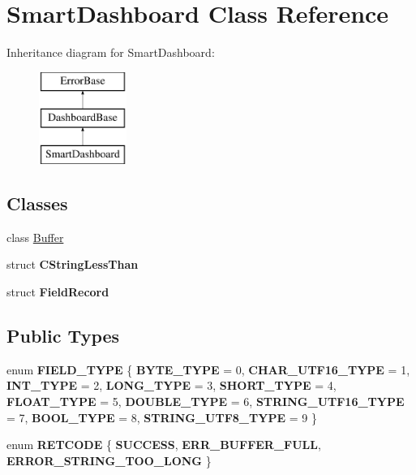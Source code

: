\hypertarget{classSmartDashboard}{\section{\-Smart\-Dashboard \-Class \-Reference}
\label{classSmartDashboard}
}
\-Inheritance diagram for \-Smart\-Dashboard\-:\begin{figure}[H]
\begin{center}
\leavevmode
\includegraphics[height=3.000000cm]{classSmartDashboard}
\end{center}
\end{figure}
\subsection*{\-Classes}
\begin{DoxyCompactItemize}
\item 
class \hyperlink{classSmartDashboard_1_1Buffer}{\-Buffer}
\item 
struct {\bfseries \-C\-String\-Less\-Than}
\item 
struct {\bfseries \-Field\-Record}
\end{DoxyCompactItemize}
\subsection*{\-Public \-Types}
\begin{DoxyCompactItemize}
\item 
enum {\bfseries \-F\-I\-E\-L\-D\-\_\-\-T\-Y\-P\-E} \{ \*
{\bfseries \-B\-Y\-T\-E\-\_\-\-T\-Y\-P\-E} =  0, 
{\bfseries \-C\-H\-A\-R\-\_\-\-U\-T\-F16\-\_\-\-T\-Y\-P\-E} =  1, 
{\bfseries \-I\-N\-T\-\_\-\-T\-Y\-P\-E} =  2, 
{\bfseries \-L\-O\-N\-G\-\_\-\-T\-Y\-P\-E} =  3, 
\*
{\bfseries \-S\-H\-O\-R\-T\-\_\-\-T\-Y\-P\-E} =  4, 
{\bfseries \-F\-L\-O\-A\-T\-\_\-\-T\-Y\-P\-E} =  5, 
{\bfseries \-D\-O\-U\-B\-L\-E\-\_\-\-T\-Y\-P\-E} =  6, 
{\bfseries \-S\-T\-R\-I\-N\-G\-\_\-\-U\-T\-F16\-\_\-\-T\-Y\-P\-E} =  7, 
\*
{\bfseries \-B\-O\-O\-L\-\_\-\-T\-Y\-P\-E} =  8, 
{\bfseries \-S\-T\-R\-I\-N\-G\-\_\-\-U\-T\-F8\-\_\-\-T\-Y\-P\-E} =  9
 \}
\item 
enum {\bfseries \-R\-E\-T\-C\-O\-D\-E} \{ {\bfseries \-S\-U\-C\-C\-E\-S\-S}, 
{\bfseries \-E\-R\-R\-\_\-\-B\-U\-F\-F\-E\-R\-\_\-\-F\-U\-L\-L}, 
{\bfseries \-E\-R\-R\-O\-R\-\_\-\-S\-T\-R\-I\-N\-G\-\_\-\-T\-O\-O\-\_\-\-L\-O\-N\-G}
 \}
\end{DoxyCompactItemize}
